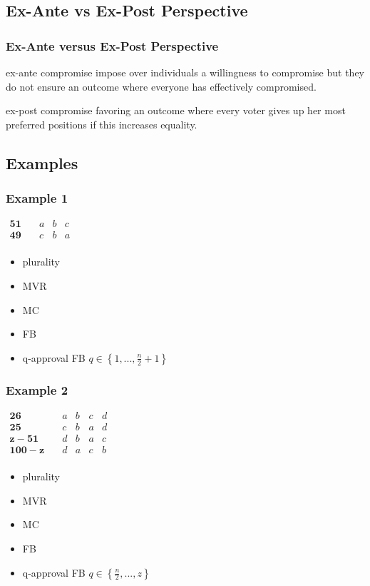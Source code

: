 \documentclass{beamer}
\begin{document}
\subsection{Ex-Ante vs Ex-Post Perspective}
\begin{frame}
	\frametitle{Ex-Ante versus Ex-Post Perspective}
	\begin{block}{ex-ante compromise}
		impose over individuals a willingness to compromise but they do not ensure an outcome where everyone has effectively compromised. 
	\end{block}
	\begin{block}{ex-post compromise}
		favoring an outcome	where every voter gives up her most preferred positions if this
		increases equality. 
	\end{block}
\end{frame}

\subsection{Examples}
\begin{frame}
	\frametitle{Example 1}
	\begin{center}
		$
		\begin{array}{cccc}
		\mathbf{51} \quad &a&b&c\\
		\mathbf{49} \quad &c&b&a\\
		\end{array}
		$
	\end{center}
	\begin{itemize}
		\item plurality
		\item MVR
		\item MC
		\item FB
		\item q-approval FB 	$q\in \left\{ 1,..., \frac{n}{2} +1\right\} $
	\end{itemize}
\end{frame}

\begin{frame}
	\frametitle{Example 2}
	\begin{center}
		$
		\begin{array}{ccccc}
		\mathbf{26} \quad &a&b&c&d\\
		\mathbf{25} \quad &c&b&a&d\\
		\mathbf{z-51} \quad &d&b&a&c\\
		\mathbf{100-z} \quad &d&a&c&b\\
		\end{array}
		$
	\end{center}
	\begin{itemize}
		\item plurality
		\item MVR
		\item MC
		\item FB
		\item q-approval FB $q\in \left\{ \frac{n}{2},..., z\right\}$
	\end{itemize}
\end{frame}
\end{document}
